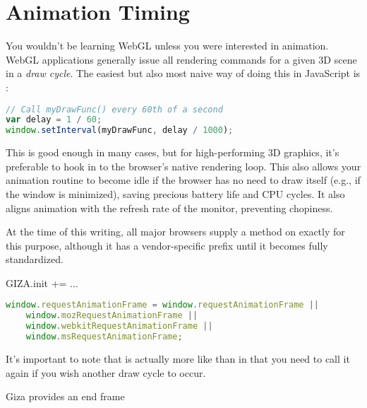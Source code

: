 \begin{comment}
Note that we're not addressing css-opacity.

In this book, we never add children elements to \code{<canvas>}, but there's nothing wrong with doing so.  On some platforms, this can degrade performance, although this is improving as WebGL implementations are maturing.

http://www.svgopen.org/2005/papers/abstractsvgopen/
http://stackoverflow.com/questions/9491417/when-webgl-decide-to-update-the-display?answertab=votes#tab-top

\end{comment}

\section{Animation Timing}

You wouldn't be learning WebGL unless you were interested in animation.  WebGL applications generally issue all rendering commands for a given 3D scene in a \emph{draw cycle}.  The easiest but also most naive way of doing this in JavaScript is :

\begin{lstlisting}[language=JavaScript]
// Call myDrawFunc() every 60th of a second
var delay = 1 / 60;
window.setInterval(myDrawFunc, delay / 1000);
\end{lstlisting}

This is good enough in many cases, but for high-performing 3D graphics, it's preferable to hook in to the browser's native rendering loop.  This also allows your animation routine to become idle if the browser has no need to draw itself (e.g., if the window is minimized), saving precious battery life and CPU cycles.  It also aligns animation with the refresh rate of the monitor, preventing chopiness.

At the time of this writing, all major browsers supply a method on  exactly for this purpose, although it has a vendor-specific prefix until it becomes fully standardized.

GIZA.init += ...

\begin{lstlisting}[language=JavaScript]
  window.requestAnimationFrame = window.requestAnimationFrame ||
    window.mozRequestAnimationFrame ||
    window.webkitRequestAnimationFrame ||
    window.msRequestAnimationFrame;
\end{lstlisting}

It's important to note that  is actually more like  than  in that you need to call it again if you wish another draw cycle to occur.

Giza provides an end frame


